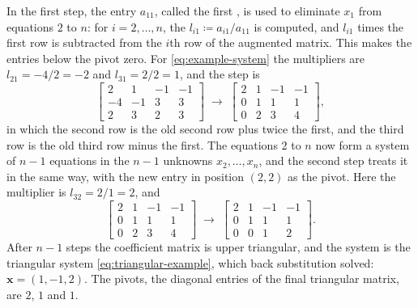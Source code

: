 In the first step, the entry $a_{11}$, called the first , is used to eliminate $x_1$ from equations $2$ to $n$: for $i=2,\ldots,n$, the  $l_{i1}\coloneqq a_{i1}/a_{11}$ is computed, and $l_{i1}$ times the first row is subtracted from the $i$th row of the augmented matrix. This makes the entries below the pivot zero. For \eqref{eq:example-system} the multipliers are $l_{21}=-4/2=-2$ and $l_{31}=2/2=1$, and the step is
\[
\left[\begin{array}{rrr|r}2&1&-1&-1\\-4&-1&3&3\\2&3&2&3\end{array}\right]
\;\longrightarrow\;
\left[\begin{array}{rrr|r}2&1&-1&-1\\0&1&1&1\\0&2&3&4\end{array}\right],
\]
in which the second row is the old second row plus twice the first, and the third row is the old third row minus the first. The equations $2$ to $n$ now form a system of $n-1$ equations in the $n-1$ unknowns $x_2,\ldots,x_n$, and the second step treats it in the same way, with the new entry in position $(2,2)$ as the pivot. Here the multiplier is $l_{32}=2/1=2$, and
\[
\left[\begin{array}{rrr|r}2&1&-1&-1\\0&1&1&1\\0&2&3&4\end{array}\right]
\;\longrightarrow\;
\left[\begin{array}{rrr|r}2&1&-1&-1\\0&1&1&1\\0&0&1&2\end{array}\right].
\]
After $n-1$ steps the coefficient matrix is upper triangular, and the system is the triangular system \eqref{eq:triangular-example}, which back substitution solved: $\mathbf x=(1,-1,2)$. The pivots, the diagonal entries of the final triangular matrix, are $2$, $1$ and $1$.

